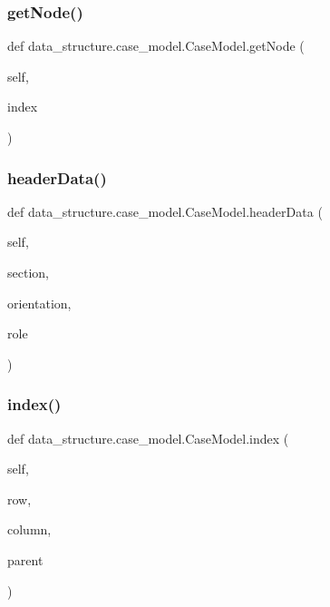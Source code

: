 \subsubsection{\texorpdfstring{get\+Node()}{getNode()}}
{\footnotesize\ttfamily def data\+\_\+structure.\+case\+\_\+model.\+Case\+Model.\+get\+Node (\begin{DoxyParamCaption}\item[{}]{self,  }\item[{}]{index }\end{DoxyParamCaption})}

\hypertarget{classdata__structure_1_1case__model_1_1_case_model_a6a1656f6697b334ba6112c194cf04611}{}\label{classdata__structure_1_1case__model_1_1_case_model_a6a1656f6697b334ba6112c194cf04611} 
\subsubsection{\texorpdfstring{header\+Data()}{headerData()}}
{\footnotesize\ttfamily def data\+\_\+structure.\+case\+\_\+model.\+Case\+Model.\+header\+Data (\begin{DoxyParamCaption}\item[{}]{self,  }\item[{}]{section,  }\item[{}]{orientation,  }\item[{}]{role }\end{DoxyParamCaption})}

\hypertarget{classdata__structure_1_1case__model_1_1_case_model_a3c52ee6daea1dc2ce7bb23833c761ed2}{}\label{classdata__structure_1_1case__model_1_1_case_model_a3c52ee6daea1dc2ce7bb23833c761ed2} 
\subsubsection{\texorpdfstring{index()}{index()}}
{\footnotesize\ttfamily def data\+\_\+structure.\+case\+\_\+model.\+Case\+Model.\+index (\begin{DoxyParamCaption}\item[{}]{self,  }\item[{}]{row,  }\item[{}]{column,  }\item[{}]{parent }\end{DoxyParamCaption})}

